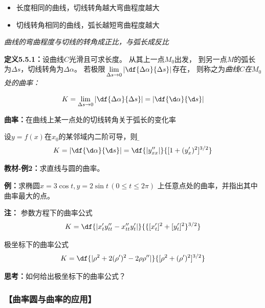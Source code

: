 \begin{itemize}
  \setlength{\itemindent}{1cm}
  \item 长度相同的曲线，切线转角越大弯曲程度越大
  \item 切线转角相同的曲线，弧长越短弯曲程度越大
\end{itemize}

{\it 曲线的弯曲程度与切线的转角成正比，与弧长成反比}

{\bf 定义5.5.1：}设曲线$C$光滑且可求长度。 从其上一点$M_0$出发，
到另一点$M$的弧长为$\Delta s$，切线转角为$\Delta\alpha$。
 若极限$\lim\limits_{\Delta s\to
0}\left|\df{\Delta\alpha}{\Delta s}\right|$存在，
则称之为{\it 曲线$C$在$M_0$处的曲率：}

$${K=\lim\limits_{\Delta s\to
0}\left|\df{\Delta\alpha}{\Delta s}\right|
=\left|\df{\d\alpha}{\d s}\right|}$$ 

{\bf 曲率：}在曲线上某一点处的切线转角关于弧长的变化率


设$y=f(x)$在$x_0$的某邻域内二阶可导，则
{\b $$K=\left|\df{\d\alpha}{\d s}\right|
 =\df{|y''_{xx}|}{[1+(y'_x)^2]^{3/2}}$$}
 
{\bf 教材-例2：}求直线与圆的曲率。

{\bf 例：}求椭圆$x=3\cos t,y=2\sin t\,(0\leq t\leq 2\pi)$
上任意点处的曲率，并指出其中曲率最大的点。

\begin{center}
\end{center}

{\bf 注：} {参数方程下的曲率公式}
$${K=\df{|x'_ty''_{tt}-x''_{tt}y'_t|}
{\{[x'_t]^2+[y'_t]^2\}^{3/2}}}$$

极坐标下的曲率公式
$$K=\df{|\rho^2+2(\rho')^2-2\rho\rho''|}{[\rho^2+(\rho')^2]^{3/2}}$$

{\bf 思考：}如何给出极坐标下的曲率公式？

\subsubsection{【曲率圆与曲率的应用】}

